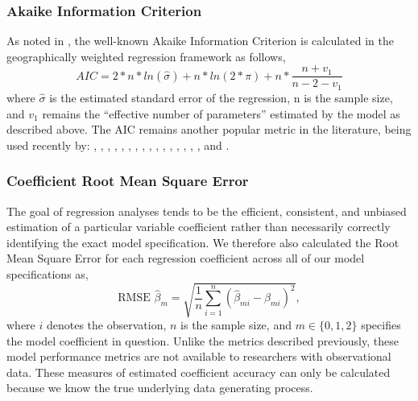 \documentclass{article}\usepackage[]{graphicx}\usepackage[]{color}
\begin{document}
% 


\subsubsection{Akaike Information Criterion}
As noted in \citep{Fotheringham2002}, the well-known Akaike Information Criterion is calculated in the geographically weighted regression framework as follows,
\begin{equation}\label{eq:AIC}
AIC =  2*n*ln(\hat{\sigma}) + n*ln(2*\pi) + 
    n*\frac{n + v_1}{n - 2 - v_1}
    \end{equation}
where $\hat{\sigma}$ is the estimated standard error of the regression, n is the sample size, and $v_1$ remains the ``effective number of parameters'' estimated by the model as described above. The AIC remains another popular metric in the literature, being used recently by: \citet{Foody2003}, \citet{Kestens2005}, \citet{Yu2006}, \citet{Yu2007}, \citet{Yu2007a}, \cite{Borst2007}, \citet{Partridge2007}, \citet{Cahill2007}, \citet{Eckey2007}, \citet{Partridge2008}, \citet{Tu2008}, \citet{Helbich2009}, \citet{Hanink2010}, \citet{Sa2010}, \citet{PinedaJaimes2010}, \citet{Axhausen2010}, and \citet{Haynes2011}.

\subsubsection{Coefficient Root Mean Square Error}

The goal of regression analyses tends to be the efficient, consistent, and unbiased estimation of a particular variable coefficient rather than necessarily correctly identifying the exact model specification. We therefore also calculated the Root Mean Square Error for each regression coefficient across all of our model specifications as,
\begin{equation}
\textrm{RMSE } \widehat{\beta} _m = \sqrt{\frac{1}{n} \sum _{i=1}^n (\widehat{\beta} _{mi} - \beta _{mi})^2},   
\end{equation}
where $i$ denotes the observation, $n$ is the sample size, and $m \in \{0, 1, 2\}$ specifies the model coefficient in question.  Unlike the metrics described previously, these model performance metrics are not available to researchers with observational data. These measures of estimated coefficient accuracy can only be calculated because we know the true underlying data generating process. 
\end{document}
